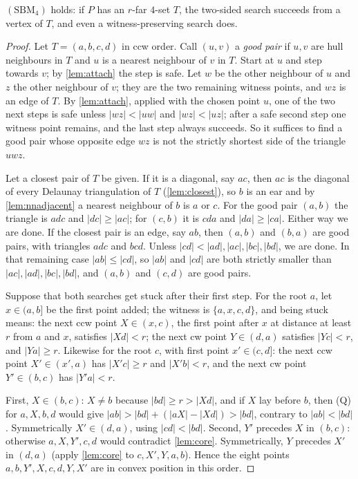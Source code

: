 \begin{theorem}\label{thm:sbm4}
$(\mathrm{SBM}_4)$ holds: if $P$ has an $r$-far $4$-set $T$, the two-sided
search succeeds from a vertex of $T$, and even a witness-preserving search does.
\end{theorem}
\begin{proof}
Let $T=(a,b,c,d)$ in ccw order. Call $(u,v)$ a \emph{good pair} if $u,v$ are
hull neighbours in $T$ and $u$ is a nearest neighbour of $v$ in $T$. Start at
$u$ and step towards $v$; by \cref{lem:attach} the step is safe. Let $w$ be
the other neighbour of $u$ and $z$ the other neighbour of $v$; they are the
two remaining witness points, and $wz$ is an edge of $T$. By \cref{lem:attach},
applied with the chosen point $u$, one of the two next steps is safe unless $|wz|<|uw|$ and
$|wz|<|uz|$; after a safe second step one witness point remains, and the last
step always succeeds. So it suffices to find a good pair whose opposite edge
$wz$ is not the strictly shortest side of the triangle $uwz$.

Let a closest pair of $T$ be given. If it is a diagonal, say $ac$, then $ac$
is the diagonal of every Delaunay triangulation of $T$ (\cref{lem:closest}),
so $b$ is an ear and by \cref{lem:nnadjacent} a nearest neighbour of $b$ is
$a$ or $c$. For the good pair $(a,b)$ the triangle is $adc$ and $|dc|\ge|ac|$;
for $(c,b)$ it is $cda$ and $|da|\ge|ca|$. Either way we are done. If the
closest pair is an edge, say $ab$, then $(a,b)$ and $(b,a)$ are good pairs,
with triangles $adc$ and $bcd$. Unless $|cd|<|ad|,|ac|,|bc|,|bd|$, we are done.
In that remaining case $|ab|\le|cd|$, so $|ab|$ and $|cd|$ are both strictly
smaller than $|ac|,|ad|,|bc|,|bd|$, and $(a,b)$ and $(c,d)$ are good pairs.

Suppose that both searches get stuck after their first step. For the root
$a$, let $x\in(a,b]$ be the first point added; the witness is
$\{a,x,c,d\}$, and being stuck means: the next ccw point $X\in(x,c)$, the
first point after $x$ at distance at least $r$ from $a$ and $x$, satisfies
$|Xd|<r$; the next cw point $Y\in(d,a)$ satisfies $|Yc|<r$, and $|Ya|\ge r$.
Likewise for the root $c$, with first point $x'\in(c,d]$: the next ccw point
$X'\in(x',a)$ has $|X'c|\ge r$ and $|X'b|<r$, and the next cw point
$Y'\in(b,c)$ has $|Y'a|<r$.

First, $X\in(b,c)$: $X\ne b$ because $|bd|\ge r>|Xd|$, and if $X$ lay before
$b$, then (Q) for $a,X,b,d$ would give $|ab|>|bd|+(|aX|-|Xd|)>|bd|$, contrary
to $|ab|<|bd|$. Symmetrically $X'\in(d,a)$, using $|cd|<|bd|$. Second, $Y'$
precedes $X$ in $(b,c)$: otherwise $a,X,Y',c,d$ would contradict
\cref{lem:core}. Symmetrically, $Y$ precedes $X'$ in $(d,a)$ (apply
\cref{lem:core} to $c,X',Y,a,b$). Hence the eight points
$a,b,Y',X,c,d,Y,X'$ are in convex position in this order.


\end{proof}
